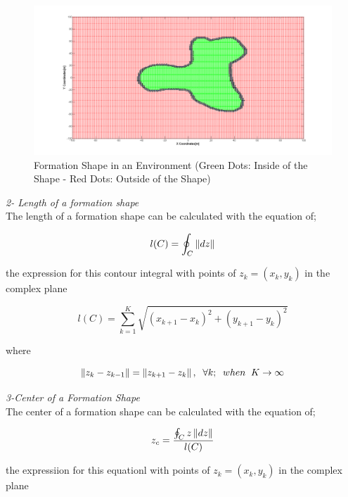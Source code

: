 \begin{figure}[H]
\caption{Formation Shape in an Environment (Green Dots: Inside of the Shape - Red Dots: Outside of the Shape)}
\centering			
\includegraphics[scale = 0.30]{iceride_disarida}
\end{figure}

\textit{ 	2- Length of a formation shape} \\ 
The length of a formation shape can be calculated with the equation of;
		
\begin{equation}
l(C)= \oint_C \left\lVert dz\right\rVert
\end{equation}
		
the expression for this contour integral with points of   $z_k = (x_k,y_k)$ in the complex plane

\begin{equation}
l(C) = \sum_{k=1}^{K}\sqrt{(x_{k+1} - x_k)^2 + (y_{k+1} - y_k)^2}
\end{equation}

where

\begin{equation}
\left\lVert z_k - z_{k-1}\right\rVert = \left\lVert z_{k+1} - z_k\right\rVert, \hspace{0.2cm}  \forall k ;  \hspace{0.2cm} when  \hspace{0.2cm} K \to\infty
\end{equation}
		
\textit{ 	3-Center of a Formation Shape} \\ 	
The center of a formation shape can be calculated with the equation of;

\begin{equation}
 z_c = \frac{\oint_C z\left\lVert dz\right\rVert}{l(C)}
\end{equation}
		
the expressiion for this equationl with points of  $z_k = (x_k,y_k)$ in the complex plane

